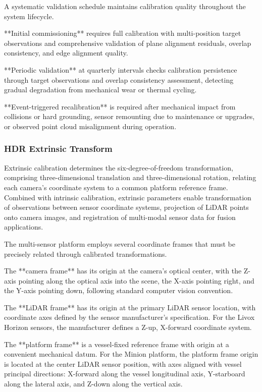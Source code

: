 \documentclass{erauthesis}
\begin{document}
A systematic validation schedule maintains calibration quality throughout the system lifecycle.

**Initial commissioning** requires full calibration with multi-position target observations and comprehensive validation of plane alignment residuals, overlap consistency, and edge alignment quality.

**Periodic validation** at quarterly intervals checks calibration persistence through target observations and overlap consistency assessment, detecting gradual degradation from mechanical wear or thermal cycling.

**Event-triggered recalibration** is required after mechanical impact from collisions or hard grounding, sensor remounting due to maintenance or upgrades, or observed point cloud misalignment during operation.

\subsubsection{HDR Extrinsic Transform} \label{HDR_extrinsic}

Extrinsic calibration determines the six-degree-of-freedom transformation, comprising three-dimensional translation and three-dimensional rotation, relating each camera's coordinate system to a common platform reference frame.
Combined with intrinsic calibration, extrinsic parameters enable transformation of observations between sensor coordinate systems, projection of LiDAR points onto camera images, and registration of multi-modal sensor data for fusion applications.


The multi-sensor platform employs several coordinate frames that must be precisely related through calibrated transformations.

The **camera frame** has its origin at the camera's optical center, with the Z-axis pointing along the optical axis into the scene, the X-axis pointing right, and the Y-axis pointing down, following standard computer vision convention.

The **LiDAR frame** has its origin at the primary LiDAR sensor location, with coordinate axes defined by the sensor manufacturer's specification.
For the Livox Horizon sensors, the manufacturer defines a Z-up, X-forward coordinate system.

The **platform frame** is a vessel-fixed reference frame with origin at a convenient mechanical datum.
For the Minion platform, the platform frame origin is located at the center LiDAR sensor position, with axes aligned with vessel principal directions: X-forward along the vessel longitudinal axis, Y-starboard along the lateral axis, and Z-down along the vertical axis.
\end{document}
